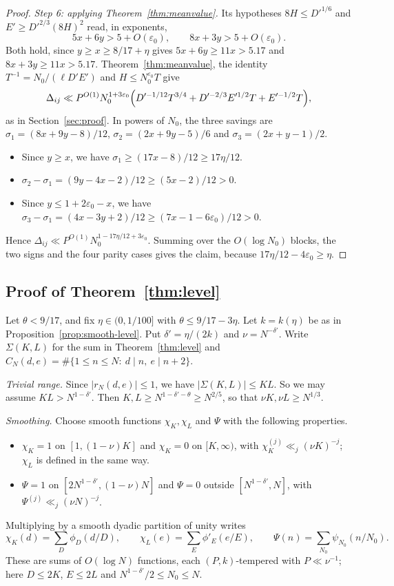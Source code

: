 \documentclass[11pt]{amsart}
\theoremstyle{definition}
\theoremstyle{remark}
\numberwithin{equation}{section}
\newcommand{\eps}{\varepsilon}
\begin{document}
\begin{proof}
\emph{Step 6: applying Theorem~\ref{thm:meanvalue}.}  Its hypotheses
$8H\le D'^{1/6}$ and $E'\ge D'^{2/3}(8H)^2$ read, in exponents,
\[
 5x+6y>5+O(\eps_0),\qquad 8x+3y>5+O(\eps_0).
\]
Both hold, since $y\ge x\ge8/17+\eta$ gives $5x+6y\ge11x>5.17$ and
$8x+3y\ge11x>5.17$.  Theorem~\ref{thm:meanvalue}, the identity
$T^{-1}=N_0/(\ell D'E')$ and $H\le N_0^{\eps_0}T$ give
\[
 \Delta_{ij}\ll P^{O(1)}N_0^{1+3\eps_0}\Bigl(D'^{-1/12}T^{3/4}
 +D'^{-2/3}E'^{1/2}T+E'^{-1/2}T\Bigr),
\]
as in Section~\ref{sec:proof}.  In powers of $N_0$, the three savings are
$\sigma_1=(8x+9y-8)/12$, $\sigma_2=(2x+9y-5)/6$ and $\sigma_3=(2x+y-1)/2$.
\begin{itemize}
\item Since $y\ge x$, we have $\sigma_1\ge(17x-8)/12\ge17\eta/12$.
\item $\sigma_2-\sigma_1=(9y-4x-2)/12\ge(5x-2)/12>0$.
\item Since $y\le1+2\eps_0-x$, we have
$\sigma_3-\sigma_1=(4x-3y+2)/12\ge(7x-1-6\eps_0)/12>0$.
\end{itemize}
Hence $\Delta_{ij}\ll P^{O(1)}N_0^{1-17\eta/12+3\eps_0}$.  Summing over the
$O(\log N_0)$ blocks, the two signs and the four parity cases gives the
claim, because $17\eta/12-4\eps_0\ge\eta$.
\end{proof}

\subsection{Proof of Theorem~\ref{thm:level}}
Let $\theta<9/17$, and fix $\eta\in(0,1/100]$ with $\theta\le9/17-3\eta$.
Let $k=k(\eta)$ be as in Proposition~\ref{prop:smooth-level}.  Put
$\delta'=\eta/(2k)$ and $\nu=N^{-\delta'}$.  Write $\Sigma(K,L)$ for the sum
in Theorem~\ref{thm:level} and
$C_N(d,e)=\#\{1\le n\le N:\ d\mid n,\ e\mid n+2\}$.

\emph{Trivial range.}  Since $|r_N(d,e)|\le1$, we have $|\Sigma(K,L)|\le KL$.
So we may assume $KL>N^{1-\delta'}$.  Then $K,L\ge N^{1-\delta'-\theta}\ge
N^{2/5}$, so that $\nu K,\nu L\ge N^{1/3}$.

\emph{Smoothing.}  Choose smooth functions $\chi_K,\chi_L$ and $\Psi$ with
the following properties.
\begin{itemize}
\item $\chi_K=1$ on $[1,(1-\nu)K]$ and $\chi_K=0$ on $[K,\infty)$, with
$\chi_K^{(j)}\ll_j(\nu K)^{-j}$; $\chi_L$ is defined in the same way.
\item $\Psi=1$ on $[2N^{1-\delta'},(1-\nu)N]$ and $\Psi=0$ outside
$[N^{1-\delta'},N]$, with $\Psi^{(j)}\ll_j(\nu N)^{-j}$.
\end{itemize}
Multiplying by a smooth dyadic partition of unity writes
\[
 \chi_K(d)=\sum_D\phi_D(d/D),\qquad
 \chi_L(e)=\sum_E\phi'_E(e/E),\qquad
 \Psi(n)=\sum_{N_0}\psi_{N_0}(n/N_0).
\]
These are sums of $O(\log N)$ functions, each $(P,k)$-tempered with
$P\ll\nu^{-1}$; here $D\le2K$, $E\le2L$ and $N^{1-\delta'}/2\le N_0\le N$.
\end{document}
